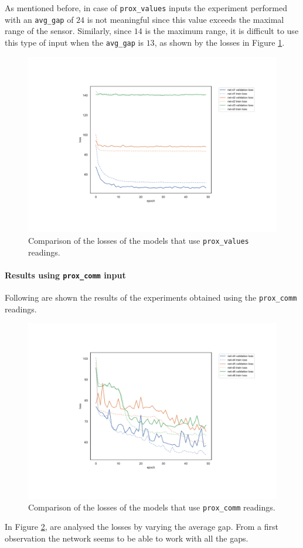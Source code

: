 As mentioned before, in case of \texttt{prox\_values} inputs the 
experiment performed with an \texttt{avg\_gap} of $24$ is not meaningful since 
this value exceeds the maximal range of the sensor. Similarly, since $14$ is the 
maximum range, it is difficult to use this type of input when the \texttt{avg\_gap}  
is $13$, as shown by the losses in Figure \ref{fig:distlossprox_values}.
\begin{figure}[!htb]
	\centering
	\includegraphics[width=.85\textwidth]{contents/images/task1/loss-distributed-prox_values@}%
	\caption{Comparison of the losses of the models that use \texttt{prox\_values} 
		readings.}
	\label{fig:distlossprox_values}
\end{figure}

\paragraph*{Results using \texttt{prox\_comm} input}
Following are shown the results of the experiments obtained using the 
\texttt{prox\_comm} readings. 
\begin{figure}[!htb]
	\centering
	\includegraphics[width=.85\textwidth]{contents/images/task1/loss-distributed-prox_comm@}%
	\caption{Comparison of the losses of the models that use \texttt{prox\_comm} 
		readings.}
	\label{fig:distlossprox_comm}
\end{figure}
In Figure \ref{fig:distlossprox_comm}, are analysed the losses by varying the 
average gap. From a first observation the network seems to be able to work with 
all the gaps.

